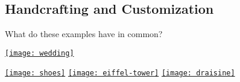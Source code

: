 \subsection{Handcrafting and Customization}
\begin{frame}{What do these examples have in common?}
	\begin{mycolumns}[columns=3,widths={35,28},animation=none]
		\href{https://de.wikipedia.org/wiki/Datei:White_and_red_wedding_dress.jpg}{\texttt{[image: wedding]}}
		
		\href{https://st.museum-digital.de/singleimage?noiiif=1&&imagenr=55758}{\texttt{[image: shoes]}}
	\mynextcolumn
		\href{https://commons.wikimedia.org/wiki/File:Tour_Eiffel_Wikimedia_Commons_(cropped).jpg}{\texttt{[image: eiffel-tower]}}
	\mynextcolumn
		\href{https://en.wikipedia.org/wiki/File:Draisine_or_Laufmaschine,_around_1820._Archetype_of_the_Bicycle._Pic_01.jpg}{\texttt{[image: draisine]}}
		
		~
		
	\end{mycolumns}
\end{frame}


